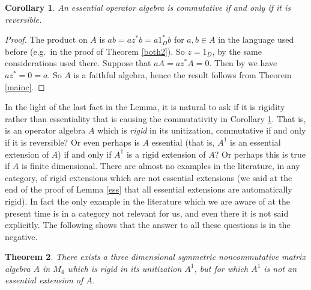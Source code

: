 \documentclass{amsart}
\newtheorem{theorem}{Theorem}[section]
\newtheorem{corollary}[theorem]{Corollary}
\theoremstyle{remark}
\theoremstyle{definition}
\numberwithin{equation}{section}
\begin{document}
\begin{corollary} \label{essc} An essential operator algebra is commutative if and only if it is reversible.  \end{corollary}

\begin{proof}   The product on $A$ is
$ab = az^* b = a 1_D^* b$ for $a, b \in A$ in the language used before (e.g.\ in the proof of Theorem \ref{both2}). So  $z = 1_D$, by the same considerations 
used there.  Suppose that $a A = a z^* A = 0$.
Then by \cite[Proposition 4.4.12]{BLM} we have  $a z^* = 0 = a$. 
So $A$ is a faithful algebra, hence the result follows from Theorem \ref{mainc}.  \end{proof}

In the light of the last fact in the Lemma, it is natural to ask if it is rigidity rather than essentiality that is causing the commutativity in Corollary \ref{essc}.
That is, is an  operator algebra $A$ which is {\em rigid} in its unitization, commutative if and only if it is reversible?   Or even perhaps is $A$ essential (that is, $A^1$ is an essential extension of $A$) if and only if $A^1$ is a rigid extension of $A$?  
Or perhaps this is true if $A$ is finite dimensional. 
There are almost no examples in the literature, in any category, of 
rigid extensions which are not essential extensions (we said at the end of the proof of Lemma \ref{ess} that all essential extensions are automatically rigid).  
In fact the only example in the literature which we are aware of
at the present time is in a category not relevant for us, and even there it is not said explicitly. 
   The following shows that the answer to all these questions is in the negative. 

\begin{theorem}  There exists a three dimensional 
symmetric  
noncommutative matrix algebra $A$ in $M_4$ which is rigid 
in its unitization $A^1$, but for which $A^1$
is not an essential extension of $A$. 
   \end{theorem} 
\end{document}
